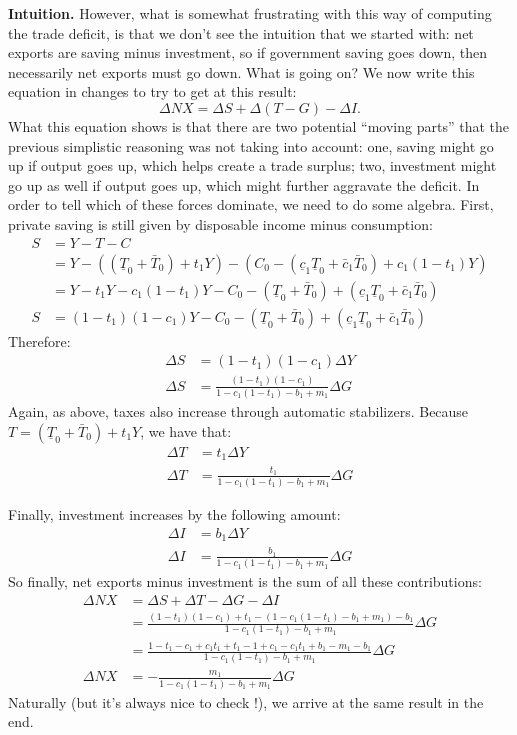 \documentclass[]{book}
\begin{document}
\textbf{Intuition.} However, what is somewhat frustrating with this way
of computing the trade deficit, is that we don't see the intuition that
we started with: net exports are saving minus investment, so if
government saving goes down, then necessarily net exports must go down.
What is going on? We now write this equation in changes to try to get at
this result: \[\Delta NX = \Delta S + \Delta(T-G) -\Delta I.\] What this
equation shows is that there are two potential ``moving parts'' that the
previous simplistic reasoning was not taking into account: one, saving
might go up if output goes up, which helps create a trade surplus; two,
investment might go up as well if output goes up, which might further
aggravate the deficit. In order to tell which of these forces dominate,
we need to do some algebra. First, private saving is still given by
disposable income minus consumption: \[
\begin{aligned}
S &= Y-T-C\\
&=Y-\left(\left(\underline{T}_{0}+\bar{T}_{0}\right)+t_1 Y\right) - \left(C_0 -\left(\underline{c}_{1}\underline{T}_0+\bar{c}_{1}\bar{T}_0\right)+c_1 (1-t_1) Y\right)\\
&=Y - t_1 Y - c_1(1-t_1)Y-C_0 - \left(\underline{T}_{0}+\bar{T}_{0}\right)+\left(\underline{c}_{1}\underline{T}_0+\bar{c}_{1}\bar{T}_0\right)\\
S&=(1-t_1)(1-c_1)Y-C_0 - \left(\underline{T}_{0}+\bar{T}_{0}\right)+\left(\underline{c}_{1}\underline{T}_0+\bar{c}_{1}\bar{T}_0\right)
\end{aligned}
\] Therefore: \[
\begin{aligned}
\Delta S &= (1-t_1)(1-c_1)\Delta Y\\
\Delta S&=\frac{(1-t_1)(1-c_1)}{1-c_1(1-t_1)-b_1+m_1}\Delta G
\end{aligned}
\] Again, as above, taxes also increase through automatic stabilizers.
Because \(T=\left(\underline{T}_{0}+\bar{T}_{0}\right)+t_1 Y\), we have
that: \[
\begin{aligned}
\Delta T &= t_1 \Delta Y\\
\Delta T&= \frac{t_1 }{1-c_1(1-t_1)-b_1+m_1}\Delta G
\end{aligned}
\]

Finally, investment increases by the following amount: \[
\begin{aligned}
\Delta I &= b_1 \Delta Y\\
\Delta I&=\frac{b_1}{1-c_1(1-t_1)-b_1+m_1}\Delta G
\end{aligned}
\] So finally, net exports minus investment is the sum of all these
contributions: \[
\begin{aligned}
\Delta NX &= \Delta S + \Delta T-\Delta G -\Delta I\\
 &= \frac{(1-t_1)(1-c_1)+t_1-\left(1-c_1(1-t_1)-b_1+m_1\right)-b_1}{1-c_1(1-t_1)-b_1+m_1}\Delta G\\
 &= \frac{1-t_1-c_1+c_1 t_1+t_1-1+c_1-c_1 t_1+b_1-m_1-b_1}{1-c_1(1-t_1)-b_1+m_1}\Delta G\\
 \Delta NX&= -\frac{m_1}{1-c_1(1-t_1)-b_1+m_1}\Delta G
\end{aligned}
\] Naturally (but it's always nice to check !), we arrive at the same
result in the end.
\end{document}

